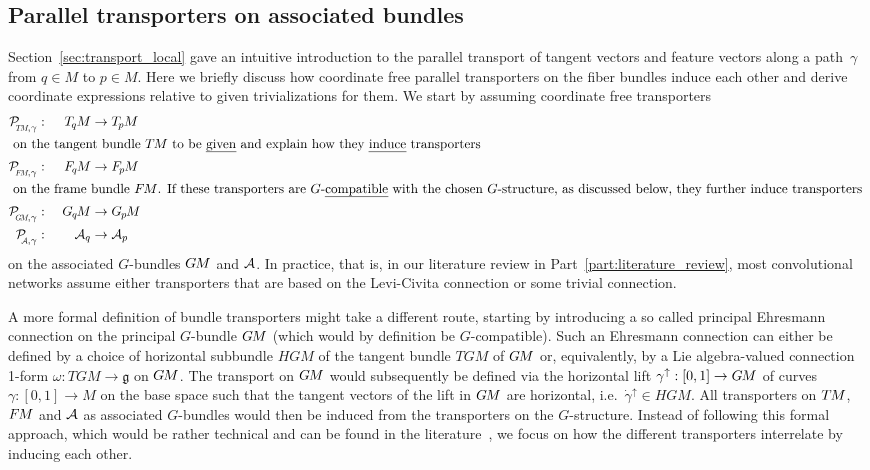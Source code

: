 

\subsection{Parallel transporters on associated bundles}
\label{sec:bundle_transport}

Section~\ref{sec:transport_local} gave an intuitive introduction to the parallel transport of tangent vectors and feature vectors along a path~$\gamma$ from $q\in M$ to $p\in M$.
Here we briefly discuss how coordinate free parallel transporters on the fiber bundles induce each other and derive coordinate expressions relative to given trivializations for them.
We start by assuming coordinate free transporters
\begin{alignat}{2}
    \PTMgamma:&\ &\TqM &\to \TpM \\
\intertext{
    on the tangent bundle $\TM$ to be \emph{given} and explain how they \emph{induce} transporters
}
    \PFMgamma:&\ &\FqM &\to \FpM \\
\intertext{
    on the frame bundle $\FM$.
    If these transporters are $G$-\emph{compatible} with the chosen $G$-structure, as discussed below, they further induce transporters
}
    \PGMgamma:&\ &\GqM &\to \GpM \\
    \PAgamma:&\  &\A_q &\to \A_p
\end{alignat}
on the associated $G$-bundles $G\mkern-1.4muM$ and $\mathcal{A}$.
In practice, that is, in our literature review in Part~\ref{part:literature_review}, most convolutional networks assume either transporters that are based on the Levi-Civita connection or some trivial connection.

A more formal definition of bundle transporters might take a different route, starting by introducing a so called principal Ehresmann connection on the principal $G$-bundle $G\mkern-1.4muM$ (which would by definition be $G$-compatible).
Such an Ehresmann connection can either be defined by a choice of horizontal subbundle $HGM$ of the tangent bundle $TGM$ of $G\mkern-1.4muM$ or, equivalently, by a Lie algebra-valued connection 1-form $\omega:TGM\to\mathfrak{g}$ on $G\mkern-1.4muM$.
The transport on $G\mkern-1.4muM$ would subsequently be defined via the horizontal lift $\gamma^\uparrow:[0,1]\to G\mkern-1.4muM$ of curves $\gamma:[0,1]\to M$ on the base space such that the tangent vectors of the lift in $G\mkern-1.4muM$ are horizontal, i.e.~$\dot{\gamma}^\uparrow \in HGM$.
All transporters on $T\mkern-1.5muM$, $F\mkern-1.5muM$ and $\mathcal{A}$ as associated $G$-bundles would then be induced from the transporters on the $G$-structure.
Instead of following this formal approach, which would be rather technical and can be found in the literature~\cite{schullerGeometricalAnatomy2016,wendlLectureNotesBundles2008,husemollerFibreBundles1994a,nakahara2003geometry,marshGaugeTheoriesFiber2016,shoshichikobayashiFoundationsDifferentialGeometry1963},
we focus on how the different transporters interrelate by inducing each other.









